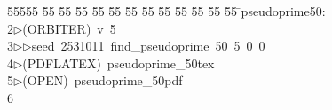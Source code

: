 %
%
\begin{tabbing}
55555 \= 55 \= 55 \= 55 \= 55 \= 55 \= 55 \= 55 \= 55 \= 55 \= 55 \= 55 \= 55 \= \>pseudoprime50:\\[0pt]
2\>$\triangleright$\>(ORBITER)\ v\ 5\ \\[0pt]
3\>$\triangleright$\>$\triangleright$\>seed\ 2531011\ find\_pseudoprime\ 50\ 5\ 0\ 0\\[0pt]
4\>$\triangleright$\>(PDFLATEX)\ pseudoprime\_50tex\\[0pt]
5\>$\triangleright$\>(OPEN)\ pseudoprime\_50pdf\\[0pt]
6\>\end{tabbing}
